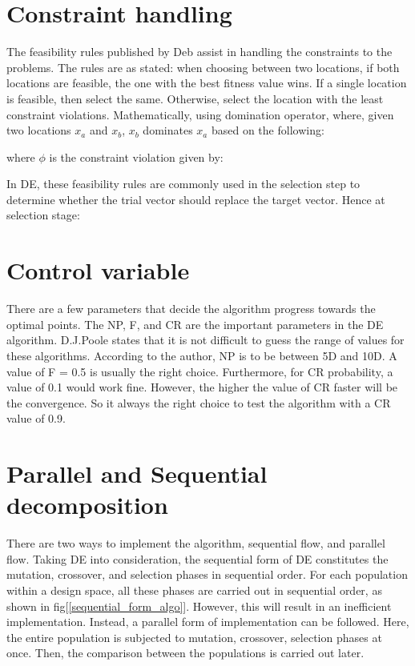 \section{Constraint handling}
The feasibility rules published by Deb \cite{Daniel} assist in handling the constraints to the problems. The rules are as stated: when choosing between two
locations, if both locations are feasible, the one with the best fitness value wins. If a single location is feasible, then select the same. Otherwise, select the location with the least constraint violations. Mathematically, using domination operator, where, given two locations $x_a$ and $x_b$, $x_b$ dominates $x_a$ based on the following:


where $\phi$ is the constraint violation given by:


In DE, these feasibility rules are commonly used in the selection step to determine whether the trial vector should
replace the target vector. Hence at selection stage:


\section{Control variable}

There are a few parameters that decide the algorithm progress towards the optimal points. The NP, F, and CR are the important parameters in the DE algorithm. D.J.Poole\cite{storn} states that it is not difficult to guess the range of values for these algorithms. According to the author, NP is to be between 5D and 10D. A value of F = 0.5 is usually the right choice. Furthermore, for CR probability, a value of 0.1 would work fine. However, the higher the value of CR faster will be the convergence. So it always the right choice to test the algorithm with a CR value of 0.9.

\section{Parallel and Sequential decomposition}
There are two ways to implement the algorithm, sequential flow, and parallel flow. Taking DE into consideration, the sequential form of DE constitutes the mutation, crossover, and selection phases in sequential order. For each population within a design space, all these phases are carried out in sequential order, as shown in fig[\ref{sequential_form_algo}]. However, this will result in an inefficient implementation. Instead, a parallel form of implementation can be followed. Here, the entire population is subjected to mutation, crossover, selection phases at once. Then, the comparison between the populations is carried out later. 


